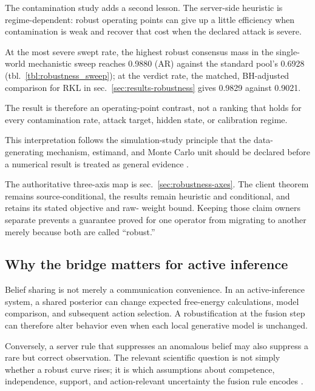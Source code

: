 \documentclass[
  english,
]{article}
\theoremstyle{plain}
\theoremstyle{definition}
\theoremstyle{remark}
\theoremstyle{definition}
\begin{document}
The contamination study adds a second lesson. The server-side heuristic
is regime-dependent: robust operating points can give up a little
efficiency when contamination is weak and recover that cost when the
declared attack is severe.

At the most severe swept rate, the highest robust consensus mass in the
single-world mechanistic sweep reaches 0.9880 (AR) against the standard
pool's 0.6928 (tbl.~\ref{tbl:robustness_sweep}); at the verdict rate,
the matched, BH-adjusted comparison for RKL in
sec.~\ref{sec:results-robustness} gives 0.9829 against 0.9021.

The result is therefore an operating-point contrast, not a ranking that
holds for every contamination rate, attack target, hidden state, or
calibration regime.

This interpretation follows the simulation-study principle that the
data-generating mechanism, estimand, and Monte Carlo unit should be
declared before a numerical result is treated as general evidence
\citep{morris2019simulation}.

The authoritative three-axis map is sec.~\ref{sec:robustness-axes}. The
client theorem remains source-conditional, the
 results remain heuristic and conditional, and
 retains its stated objective and raw-
weight bound. Keeping those claim owners separate prevents a guarantee
proved for one operator from migrating to another merely because both
are called ``robust.''

\subsection{Why the bridge matters for active
inference}\label{sec:conclusion-significance}

Belief sharing is not merely a communication convenience. In an
active-inference system, a shared posterior can change expected
free-energy calculations, model comparison, and subsequent action
selection. A robustification at the fusion step can therefore alter
behavior even when each local generative model is unchanged.

Conversely, a server rule that suppresses an anomalous belief may also
suppress a rare but correct observation. The relevant scientific
question is not simply whether a robust curve rises; it is which
assumptions about competence, independence, support, and action-relevant
uncertainty the fusion rule encodes
\citep{genest1986combining, tresp2000bayesian, heins2023collective}.
\end{document}
